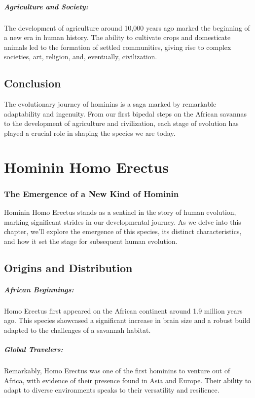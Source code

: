 \documentclass[a4paper,12pt]{book}
\begin{document}
\paragraph{Agriculture and Society:}
The development of agriculture around 10,000 years ago marked the beginning of a new era in human history. The ability to cultivate crops and domesticate animals led to the formation of settled communities, giving rise to complex societies, art, religion, and, eventually, civilization.

\section*{Conclusion}

The evolutionary journey of hominins is a saga marked by remarkable adaptability and ingenuity. From our first bipedal steps on the African savannas to the development of agriculture and civilization, each stage of evolution has played a crucial role in shaping the species we are today.

\chapter{Hominin Homo Erectus}
\subsection*{The Emergence of a New Kind of Hominin}
Hominin Homo Erectus stands as a sentinel in the story of human evolution, marking significant strides in our developmental journey. As we delve into this chapter, we'll explore the emergence of this species, its distinct characteristics, and how it set the stage for subsequent human evolution.

\section*{Origins and Distribution}

\paragraph{African Beginnings:}
Homo Erectus first appeared on the African continent around 1.9 million years ago. This species showcased a significant increase in brain size and a robust build adapted to the challenges of a savannah habitat.

\paragraph{Global Travelers:}
Remarkably, Homo Erectus was one of the first hominins to venture out of Africa, with evidence of their presence found in Asia and Europe. Their ability to adapt to diverse environments speaks to their versatility and resilience.
\end{document}
